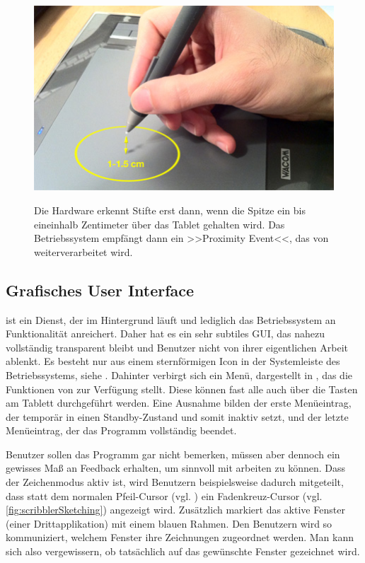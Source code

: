 \begin{figure}
        {\includegraphics[width=1\linewidth]{gfx/scribblerProximity}}
		\caption[Proximity Event]{Die Hardware erkennt Stifte erst dann, wenn die Spitze ein bis eineinhalb Zentimeter über das Tablet gehalten wird. Das Betriebssystem empfängt dann ein >>Proximity Event<<, das von \scribbler weiterverarbeitet wird.}\label{fig:scribblerProximity}
\end{figure}

\subsection{Grafisches User Interface} 
\scribbler ist ein Dienst, der im Hintergrund läuft und lediglich das Betriebssystem an Funktionalität anreichert. Daher hat es ein sehr subtiles \ac{GUI}, das nahezu vollständig transparent bleibt und Benutzer nicht von ihrer eigentlichen Arbeit ablenkt. Es besteht nur aus einem sternförmigen Icon in der Systemleiste des Betriebssystems, siehe . Dahinter verbirgt sich ein Menü, dargestellt in , das die Funktionen von \scribbler zur Verfügung stellt. Diese können fast alle auch über die Tasten am Tablett durchgeführt werden. Eine Ausnahme bilden der erste Menüeintrag, der \scribbler temporär in einen Standby-Zustand und somit inaktiv setzt, und der letzte Menüeintrag, der das Programm vollständig beendet.

\medskip Benutzer sollen das Programm gar nicht bemerken, müssen aber dennoch ein gewisses Maß an Feedback erhalten, um sinnvoll mit \scribbler arbeiten zu können. Dass der Zeichenmodus aktiv ist, wird Benutzern beispielsweise dadurch mitgeteilt, dass statt dem normalen Pfeil-Cursor (vgl. ) ein Fadenkreuz-Cursor (vgl. \autoref{fig:scribblerSketching}) angezeigt wird. Zusätzlich markiert \scribbler das aktive Fenster (einer Drittapplikation) mit einem blauen Rahmen. Den Benutzern wird so kommuniziert, welchem Fenster ihre Zeichnungen zugeordnet werden. Man kann sich also vergewissern, ob tatsächlich auf das gewünschte Fenster gezeichnet wird.

